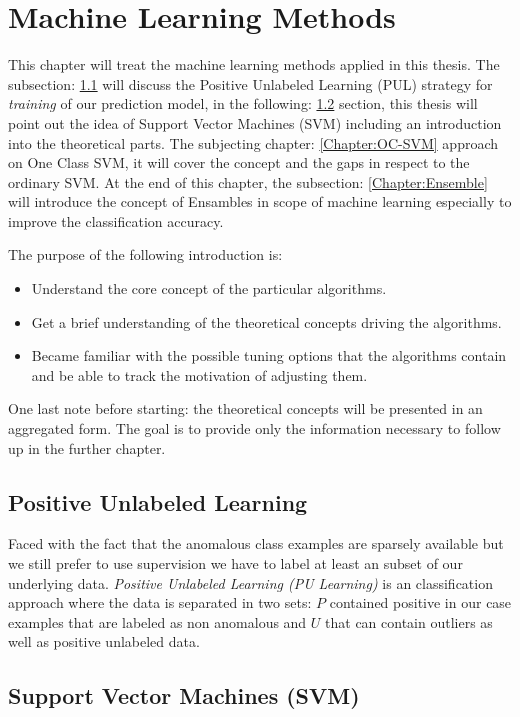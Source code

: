 \chapter{Machine Learning Methods}\label{ch:3}
This chapter will treat the machine learning methods applied in this thesis. The subsection: \ref{Chapter:PUL} will discuss the Positive Unlabeled Learning (PUL) strategy for \textit{training} of our prediction model, in the following: \ref{Chapter:SVM} section, this thesis will point out the  idea of Support Vector Machines (SVM) including an introduction into the theoretical parts. The subjecting chapter: \ref{Chapter:OC-SVM} approach on One Class SVM, it will cover the concept and the gaps in respect to the ordinary SVM. At the end of this chapter, the subsection: \ref{Chapter:Ensemble} will introduce the concept of Ensambles in scope of machine learning especially to improve the classification accuracy.

The purpose of the following introduction is:
\begin{itemize}
    \item Understand the core concept of the particular algorithms.
    
    \item Get a brief understanding of the theoretical concepts driving the algorithms.
    
    \item Became familiar with the possible tuning options that the algorithms contain and be able to track the motivation of adjusting them.
\end{itemize}
One last note before starting: the theoretical concepts will be presented in an aggregated form. The goal is to provide only the information necessary to follow up in the further chapter. 

\section{Positive Unlabeled Learning}\label{Chapter:PUL}
Faced with the fact that the anomalous class examples are sparsely available but we still prefer to use supervision we have to label at least an subset of our underlying data. \textit{Positive Unlabeled Learning (PU Learning)} is an classification approach where the data is separated in two sets: \(P\) contained positive in our case examples that are labeled as non anomalous and \(U\) that can contain outliers as well as positive unlabeled data.

\section {Support Vector Machines (SVM)}\label{Chapter:SVM}

